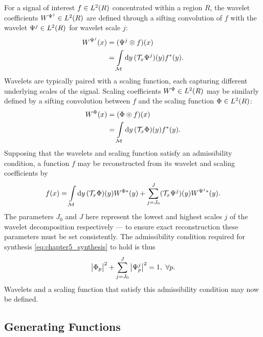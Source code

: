 For a signal of interest \(f \in L^{2}(R)\) concentrated within a region \(R\), the wavelet coefficients \(W^{\Psi^{j}} \in L^{2}(R)\) are defined through a sifting convolution of \(f\) with the wavelet \(\Psi^{j} \in L^{2}(R)\) for wavelet scale \(j\):
%
\begin{align}
	W^{\Psi^{j}}(x)
	 & = (\Psi^{j} \circledcirc{} f)(x) \nonumber                                \\
	 & = \int\limits_{\mathcal{M}} \dd{y} (\mathcal{T}_{x}\Psi^{j})(y) f^{\ast}(y).
\end{align}
%
Wavelets are typically paired with a scaling function, each capturing different underlying scales of the signal.
Scaling coefficients \(W^{\Phi} \in L^{2}(R)\) may be similarly defined by a sifting convolution between \(f\) and the scaling function \(\Phi \in L^{2}(R)\):
%
\begin{align}
	W^{\Phi}(x)
	 & = (\Phi \circledcirc{} f)(x) \nonumber                                \\
	 & = \int\limits_{\mathcal{M}} \dd{y} (\mathcal{T}_{x}\Phi)(y) f^{\ast}(y).
\end{align}
%
Supposing that the wavelets and scaling function satisfy an admissibility condition, a function \(f\) may be reconstructed from its wavelet and scaling coefficients by
%
\begin{equation}\label{eq:chapter5_synthesis}
	f(x)
	= \int\limits_{\mathcal{M}} \dd{y}
	(\mathcal{T}_{x}\Phi)(y) W^{\Phi\ast}(y)
	+ \sum\limits_{j=J_{0}}^{J} (\mathcal{T}_{x}\Psi^{j})(y) W^{\Psi^{j}\ast}(y).
\end{equation}
%
The parameters \(J_{0}\) and \(J\) here represent the lowest and highest scales \(j\) of the wavelet decomposition respectively --- to ensure exact reconstruction these parameters must be set consistently.
The admissibility condition required for synthesis \cref{eq:chapter5_synthesis} to hold is thus
%
\begin{equation}\label{eq:chapter5_admissibility}
	\big\lvert{\Phi}_{p}\big\rvert^{2}
	+ \sum\limits_{j=J_{0}}^{J} \big\lvert{\Psi}_{p}^{j}\big\rvert^{2}
	= 1,\ \forall p.
\end{equation}
%
Wavelets and a scaling function that satisfy this admissibility condition may now be defined.

\subsection{Generating Functions}\label{sec:chapter5_generating_functions}

